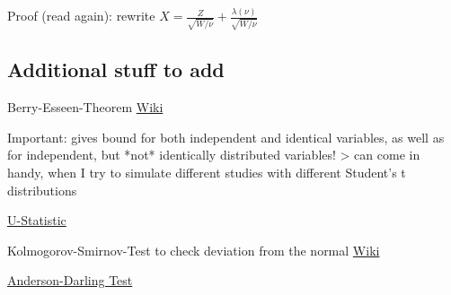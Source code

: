Proof (read again): rewrite $X = \frac{Z}{\sqrt{W/\nu}}+\frac{\lambda(\nu)}{\sqrt{W/\nu}}$

\subsection{Additional stuff to add}
Berry-Esseen-Theorem \href{https://de.wikipedia.org/wiki/Satz_von_Berry-Esseen}{Wiki}\par
Important: gives bound for both independent and identical variables, as well as for independent, but *not* identically distributed variables! > can come in handy, when I try to simulate different studies with different Student's t distributions\par
\href{https://en.wikipedia.org/wiki/U-statistic}{U-Statistic}\par
Kolmogorov-Smirnov-Test to check deviation from the normal \href{https://en.wikipedia.org/wiki/Kolmogorov\%E2\%80\%93Smirnov_test#Kolmogorov\%E2\%80\%93Smirnov_statistic}{Wiki}\par
\href {https://en.wikipedia.org/wiki/Anderson\%E2\%80\%93Darling_test}{Anderson-Darling Test}


